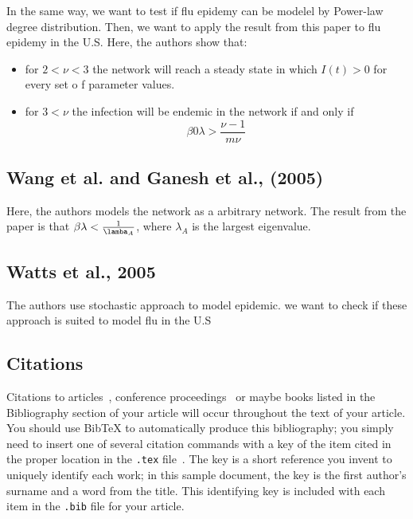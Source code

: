 In the same way, we want to test if flu epidemy can be modelel by Power-law degree distribution.
Then, we want to apply the result from this paper to flu epidemy in the U.S.
Here, the authors show that:
\begin{itemize}
    \item for $2<\nu<3$ the network will reach a steady state in which $I(t)>0$ for every set o f parameter values.
    \item for $3<\nu$ the infection will be endemic in the network if and only if 
    $$\beta0 \lambda > \frac{\nu-1}{m \nu}$$
\end{itemize}


\subsection{Wang et al. and Ganesh et al., (2005) \cite{wang2003epidemic,ganesh2005effect}}

Here, the authors models the network as a arbitrary network.
The result from the paper is that $\beta \lambda < \frac{1}{\lamba_A}$, where $\lambda_A$ is the largest eigenvalue.


\subsection{Watts et al., 2005 \cite{watts2005multiscale}
}

The authors use stochastic approach to model epidemic. we want to check if these approach is suited to model flu in the U.S

\subsection{Citations}
Citations to articles~\cite{bowman:reasoning,
clark:pct, braams:babel, herlihy:methodology},
conference proceedings~\cite{clark:pct} or maybe
books \cite{Lamport:LaTeX, salas:calculus} listed
in the Bibliography section of your
article will occur throughout the text of your article.
You should use BibTeX to automatically produce this bibliography;
you simply need to insert one of several citation commands with
a key of the item cited in the proper location in
the \texttt{.tex} file~\cite{Lamport:LaTeX}.
The key is a short reference you invent to uniquely
identify each work; in this sample document, the key is
the first author's surname and a
word from the title.  This identifying key is included
with each item in the \texttt{.bib} file for your article.

